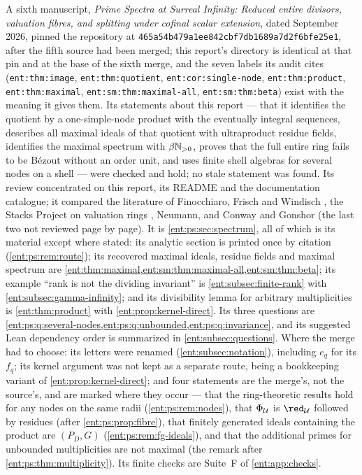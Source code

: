 \documentclass[11pt]{article}
\theoremstyle{plain}
\theoremstyle{plain}
\theoremstyle{plain}
\theoremstyle{definition}
\theoremstyle{definition}
\theoremstyle{definition}
\theoremstyle{definition}
\theoremstyle{remark}
\begin{document}
A sixth manuscript, \emph{Prime Spectra at Surreal Infinity: Reduced entire
divisors, valuation fibres, and splitting under cofinal scalar extension},
dated September 2026, pinned the repository at
\texttt{465a54b479a1ee842cbf\allowbreak 7db1689a7d2f6bfe25e1}, after the fifth
source had been merged; this report's directory is identical at that pin and
at the base of the sixth merge, and the seven labels its audit cites
(\texttt{ent:thm:image}, \texttt{ent:thm:quotient},
\texttt{ent:cor:single-node}, \texttt{ent:thm:product},
\texttt{ent:thm:maximal}, \texttt{ent:sm:thm:maximal-all},
\texttt{ent:sm:thm:beta}) exist with the meaning it gives them. Its
statements about this report --- that it identifies the quotient by a
one-simple-node product with the eventually integral sequences, describes
all maximal ideals of that quotient with ultraproduct residue fields,
identifies the maximal spectrum with $\beta\mathbb N_{>0}$, proves that the full
entire ring fails to be B\'ezout without an order unit, and uses finite shell
algebras for several nodes on a shell --- were checked and hold; no stale
statement was found. Its review concentrated on this report, its README and
the documentation catalogue; it compared the literature of Finocchiaro,
Frisch and Windisch \cite{FFW}, the Stacks Project on valuation rings
\cite{StacksValuation}, Neumann, and Conway and Gonshor (the last two not
reviewed page by page). It is \cref{ent:ps:sec:spectrum}, all of which is
its material except where stated: its analytic section is printed once by
citation (\cref{ent:ps:rem:route}); its recovered maximal ideals, residue
fields and maximal spectrum are
\cref{ent:thm:maximal,ent:sm:thm:maximal-all,ent:sm:thm:beta}; its example
``rank is not the dividing invariant'' is \cref{ent:subsec:finite-rank} with
\cref{ent:subsec:gamma-infinity}; and its divisibility lemma for arbitrary
multiplicities is \cref{ent:thm:product} with \cref{ent:prop:kernel-direct}.
Its three questions are \cref{ent:ps:q:several-nodes,ent:ps:q:unbounded,ent:ps:q:invariance},
and its suggested Lean dependency order is summarized in
\cref{ent:subsec:questions}. Where the merge had to choose: its letters were
renamed (\cref{ent:subsec:notation}), including $e_q$ for its $f_q$; its
kernel argument was not kept as a separate route, being a bookkeeping
variant of \cref{ent:prop:kernel-direct}; and four statements are the
merge's, not the source's, and are marked where they occur --- that the
ring-theoretic results hold for any nodes on the same radii
(\cref{ent:ps:rem:nodes}), that $\Phi_\mathcal U$ is $\red_\Ucal$ followed by
residues (after \cref{ent:ps:prop:fibre}), that finitely generated ideals containing the
product are $(P_D,G)$ (\cref{ent:ps:rem:fg-ideals}), and that the additional
primes for unbounded multiplicities are not maximal (the remark after
\cref{ent:ps:thm:multiplicity}). Its finite checks are Suite~F of
\cref{ent:app:checks}.
\end{document}
